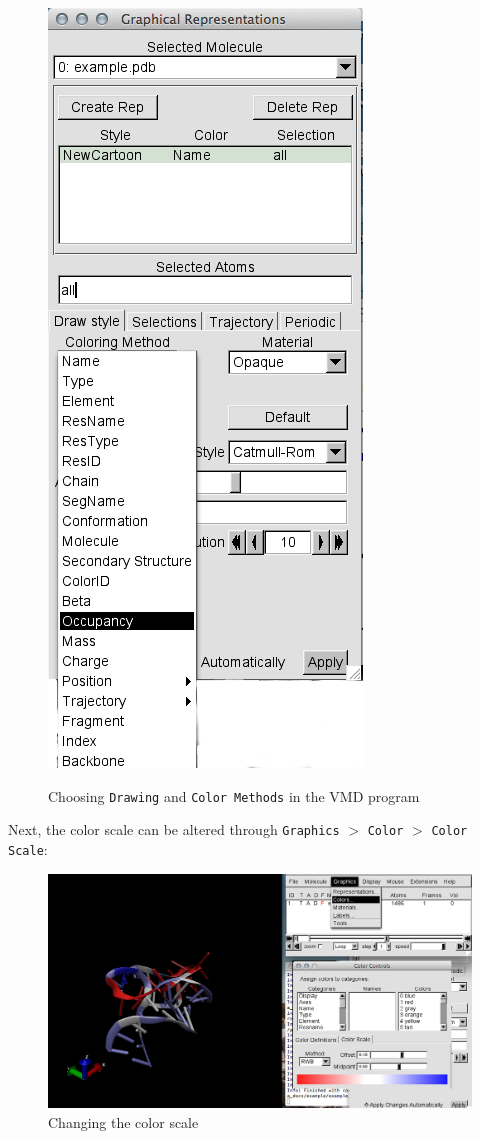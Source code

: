 \documentclass[12pt]{article}
\begin{document}
\begin{figure} [h!]
\begin{center}
{\includegraphics[scale=0.3]{pictures/vmd5.png}}
\end{center}
\caption{Choosing {\tt Drawing} and {\tt Color Methods} in the VMD program}
\end{figure} 

\newpage
Next, the color scale can be altered through {\tt Graphics} $>$ {\tt Color} $>$ {\tt Color Scale}:

\begin{figure}[h!]
\centering
\includegraphics[scale=0.4]{./pictures/vmd6.png}
\caption{Changing the color scale}
\end{figure}
\end{document}
